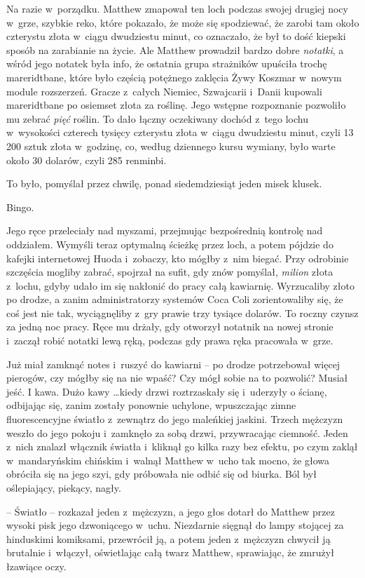 \documentclass[oneside,polish,11pt,rmheadings]{mwbk}
\begin{document}
Na razie w~porządku. Matthew zmapował ten loch podczas swojej drugiej nocy w~grze, szybkie reko, które pokazało, że może się spodziewać, że zarobi tam około czterystu złota w~ciągu dwudziestu minut, co oznaczało, że był to dość kiepski sposób na zarabianie na życie. Ale Matthew prowadził bardzo dobre \textit{notatki}, a wśród jego notatek była info, że ostatnia grupa strażników upuściła trochę mareridtbane, które było częścią potężnego zaklęcia Żywy Koszmar w~nowym module rozszerzeń. Gracze z~całych Niemiec, Szwajcarii i~Danii kupowali mareridtbane po osiemset złota za roślinę. Jego wstępne rozpoznanie pozwoliło mu zebrać \textit{pięć} roślin. To dało łączny oczekiwany dochód z~tego lochu w~wysokości czterech tysięcy czterystu złota w~ciągu dwudziestu minut, czyli 13 200 sztuk złota w~godzinę, co, według dziennego kursu wymiany, było warte około 30 dolarów, czyli 285 renminbi.


To było, pomyślał przez chwilę, ponad siedemdziesiąt jeden misek klusek. 


Bingo.


Jego ręce przeleciały nad myszami, przejmując bezpośrednią kontrolę nad oddziałem. Wymyśli teraz optymalną ścieżkę przez loch, a potem pójdzie do kafejki internetowej Huoda i~zobaczy, kto mógłby z~nim biegać. Przy odrobinie szczęścia mogliby zabrać, spojrzał na sufit, gdy znów pomyślał, \textit{milion }złota z~lochu, gdyby udało im się nakłonić do pracy całą kawiarnię. Wyrzucaliby złoto po drodze, a zanim administratorzy systemów Coca Coli zorientowaliby się, że coś jest nie tak, wyciągnęliby z~gry prawie trzy tysiące dolarów. To roczny czynsz za jedną noc pracy. Ręce mu drżały, gdy otworzył notatnik na nowej stronie i~zaczął robić notatki lewą ręką, podczas gdy prawa ręka pracowała w~grze. 


Już miał zamknąć notes i~ruszyć do kawiarni -- po drodze potrzebował więcej pierogów, czy mógłby się na nie wpaść? Czy mógł sobie na to pozwolić? Musiał jeść. I kawa. Dużo kawy \ldots  kiedy drzwi roztrzaskały się i~uderzyły o ścianę, odbijając się, zanim zostały ponownie uchylone, wpuszczając zimne fluorescencyjne światło z~zewnątrz do jego maleńkiej jaskini. Trzech mężczyzn weszło do jego pokoju i~zamknęło za sobą drzwi, przywracając ciemność. Jeden z~nich znalazł włącznik światła i~kliknął go kilka razy bez efektu, po czym zaklął w~mandaryńskim chińskim i~walnął Matthew w~ucho tak mocno, że głowa obróciła się na jego szyi, gdy próbowała nie odbić się od biurka. Ból był oślepiający, piekący, nagły. 


-- Światło -- rozkazał jeden z~mężczyzn, a jego głos dotarł do Matthew przez wysoki pisk jego dzwoniącego w~uchu. Niezdarnie sięgnął do lampy stojącej za hinduskimi komiksami, przewrócił ją, a potem jeden z~mężczyzn chwycił ją brutalnie i~włączył, oświetlając całą twarz Matthew, sprawiając, że zmrużył łzawiące oczy. 
\end{document}
